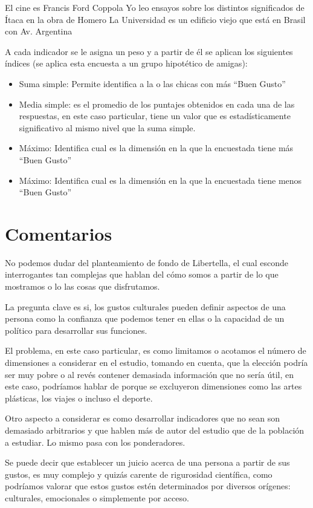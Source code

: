 \documentclass{article}
\begin{document}
El cine es Francis Ford Coppola
Yo leo ensayos sobre los distintos significados de Ítaca en la obra de Homero
La Universidad es un edificio viejo que está en Brasil con Av. Argentina

A cada indicador se le asigna un peso y a partir de él se aplican los siguientes índices (se aplica esta encuesta a un grupo hipotético de amigas):

\begin{itemize}
    \item Suma simple: Permite identifica a la o las chicas con más “Buen Gusto”
    \item Media simple: es el promedio de los puntajes obtenidos en cada una de las respuestas, en este caso particular, tiene un valor que es estadísticamente significativo al mismo nivel que la suma simple.
    \item Máximo: Identifica cual es la dimensión en la que la encuestada tiene más “Buen Gusto”
    \item Máximo: Identifica cual es la dimensión en la que la encuestada tiene menos “Buen Gusto” 
\end{itemize}


\section{Comentarios}
 
No podemos dudar del planteamiento de fondo de Libertella, el cual esconde interrogantes tan complejas que hablan del cómo somos a partir de lo que mostramos o lo las cosas que disfrutamos.

La pregunta clave es si, los gustos culturales pueden definir aspectos de una persona como la confianza que podemos tener en ellas o la capacidad de un político para desarrollar sus funciones.

El problema, en este caso particular, es como limitamos o acotamos el número de dimensiones a considerar en el estudio, tomando en cuenta, que la elección podría ser muy pobre o al revés contener demasiada información que no sería útil, en este caso, podríamos hablar de porque se excluyeron dimensiones como las artes plásticas, los viajes o incluso el deporte.

Otro aspecto a considerar es como desarrollar indicadores que no sean son demasiado arbitrarios y que hablen más de autor del estudio que de la población a estudiar. Lo mismo pasa con los ponderadores.

Se puede decir que establecer un juicio acerca de una persona a partir de sus gustos, es muy complejo y quizás carente de rigurosidad científica,  como podríamos valorar que estos gustos estén determinados por diversos orígenes: culturales, emocionales o simplemente por acceso.
 

\nocite{*}
    
\end{document}
